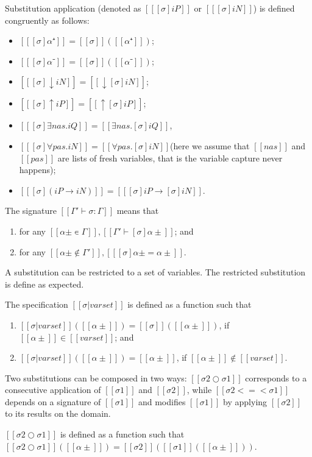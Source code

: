 \documentclass[a4,natbib=false]{article}
\begin{document}
\begin{definition}
  Substitution application (denoted as $[[ [σ]iP ]]$ or $[[ [σ]iN ]]$) 
  is defined congruently as follows:
  \begin{itemize}
    \item $[[ [σ]α⁺ ]] = [[σ]] ([[α⁺]])$;
    \item $[[ [σ]α⁻ ]] = [[σ]] ([[α⁻]])$;
    \item $[[ [σ]↓iN ]] = [[↓[σ]iN]]$;
    \item $[[ [σ]↑iP ]] = [[↑[σ]iP]]$;
    \item $[[ [σ]∃nas.iQ ]] = [[∃nas.[σ]iQ]]$, 
    \item $[[ [σ]∀pas.iN ]] = [[∀pas.[σ]iN]]$(here we assume that $[[nas]]$ and $[[pas]]$ are lists of fresh variables, 
      that is the variable capture never happens);
    \item $[[ [σ](iP → iN) ]] = [[ [σ]iP → [σ]iN ]]$.
  \end{itemize}
\end{definition}

\begin{definition}
  The signature $[[Γ' ⊢ σ : Γ]]$ means that
  \begin{enumerate}
    \item for any $[[α± ∊ {Γ}]], [[ Γ' ⊢ [σ]α± ]]$; and
    \item for any $[[α± ∉ {Γ'}]], [[ [σ]α± = α± ]]$.
  \end{enumerate}
\end{definition}

A substitution can be restricted to a set of variables. 
The restricted substitution is define as expected. 
\begin{definition}
  The specification $[[σ  | varset]]$ is defined as
  a function such that 
  \begin{enumerate}
    \item $[[σ|varset]]([[α± ]]) = [[σ]]([[α± ]])$, if $[[α± ]] \in [[varset]]$; and
    \item $[[σ|varset]]([[α± ]]) = [[α± ]]$, if $[[α± ]] \notin [[varset]]$.
  \end{enumerate}
\end{definition}

Two substitutions can be composed in two ways:
$[[σ2 ○ σ1]]$ corresponds to a consecutive application of $[[σ1]]$ and $[[σ2]]$,
while $[[σ2 <=< σ1]]$
depends on a signature of $[[σ1]]$ and modifies $[[σ1]]$ by applying
$[[σ2]]$ to its results on the domain.
\begin{definition}
  $[[σ2 ○ σ1]]$ is defined as a function such that
  $[[σ2 ○ σ1]]([[α± ]]) = [[σ2]]([[σ1]]([[α± ]]))$.
\end{definition}
\end{document}
